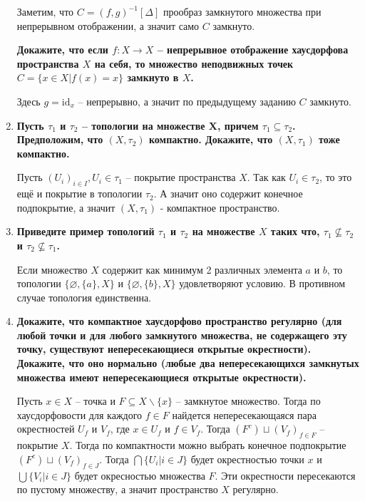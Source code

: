 \documentclass{article}
\begin{document}
\begin{enumerate}
        Заметим, что $C = (f, g)^{-1}[\Delta]$ прообраз замкнутого множества
        при непрерывном отображении, а значит само $C$ замкнуто.\par
        \textbf{Докажите, что если $f:X\longrightarrow X$ – непрерывное
        отображение хаусдорфова пространства $X$ на себя, то множество
        неподвижных точек $C=\{x\in X|f(x)=x\}$ замкнуто в $X$.}\par
        Здесь $g=\text{id}_x$ – непрерывно, а значит по предыдущему заданию $C$
        замкнуто.
    \item \textbf{Пусть $\tau_1$ и $\tau_2$ – топологии на множестве X, причем
        $\tau_1\subseteq \tau_2$. Предположим, что $(X, \tau_2)$ компактно.
        Докажите, что $(X, \tau_1)$ тоже компактно.}\par
        Пусть $(U_i)_{i\in I}, U_i \in \tau_1$ – покрытие пространства  $X$.
        Так как $U_i\in\tau_2$, то это ещё и покрытие в топологии $\tau_2$. А
        значит оно содержит конечное подпокрытие, а значит $(X, \tau_1)$ -
        компактное пространство.
    \item \textbf{Приведите пример топологий $\tau_1$ и $\tau_2$ на множестве
        $X$ таких что, $\tau_1\nsubseteq\tau_2$ и $\tau_2\nsubseteq\tau_1$.}\par
        Если множество $X$ содержит как минимум 2 различных элемента $a$ и $b$,
        то топологии $\{\varnothing, \{a\}, X\}$ и $\{\varnothing, \{b\}, X\}$
        удовлетворяют условию. В противном случае топология единственна.
    \item \textbf{Докажите, что компактное хаусдорфово пространство регулярно
        (для любой точки и для любого замкнутого множества, не содержащего эту
        точку, существуют непересекающиеся открытые окрестности). Докажите, что
        оно нормально (любые два непересекающихся замкнутых множества имеют
        непересекающиеся открытые окрестности).}\par Пусть $x\in X$ – точка и
        $F\subseteq X\backslash\{x\}$ – замкнутое множество. Тогда по хаусдорфовости
        для каждого $f\in F$ найдется непересекающаяся пара окрестностей $U_f$ и
        $V_f$, где $x\in U_f$ и $f\in V_f$. Тогда $(F^c)\sqcup (V_f)_{f\in F}$ –
        покрытие $X$. Тогда по компактности можно выбрать конечное подпокрытие
        $(F^c) \sqcup (V_f)_{f\in J}$. Тогда $\bigcap\{U_i|i\in J\}$ будет
        окрестностью точки $x$ и $\bigcup\{V_i|i\in J\}$ будет окресностью
        множества $F$. Эти окрестности пересекаются по пустому множеству, а
        значит пространство $X$ регулярно.\par

\end{enumerate}
\end{document}
